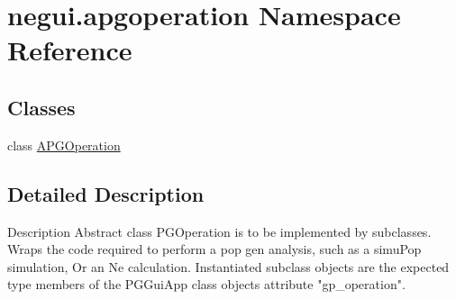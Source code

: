 \hypertarget{namespacenegui_1_1apgoperation}{}\section{negui.\+apgoperation Namespace Reference}
\label{namespacenegui_1_1apgoperation}
\subsection*{Classes}
\begin{DoxyCompactItemize}
\item 
class \hyperlink{classnegui_1_1apgoperation_1_1APGOperation}{A\+P\+G\+Operation}
\end{DoxyCompactItemize}


\subsection{Detailed Description}
\begin{DoxyVerb}Description
Abstract class PGOperation is to be implemented by subclasses.
Wraps the code required to perform a pop gen analysis, such as a simuPop simulation,
Or an Ne calculation.  Instantiated subclass objects are the expected type members 
of the PGGuiApp class objects attribute "gp_operation".\end{DoxyVerb}
 